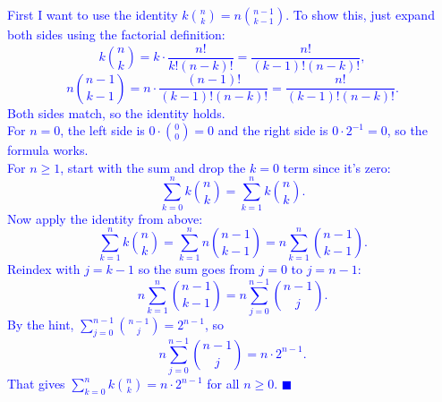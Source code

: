 \documentclass{article}
\begin{document}
\textcolor{blue}{
First I want to use the identity $k\binom{n}{k} = n\binom{n-1}{k-1}$. To show this, just expand both sides using the factorial definition:
\[
k\binom{n}{k} = k \cdot \frac{n!}{k!(n-k)!} = \frac{n!}{(k-1)!(n-k)!},
\]
\[
n\binom{n-1}{k-1} = n \cdot \frac{(n-1)!}{(k-1)!(n-k)!} = \frac{n!}{(k-1)!(n-k)!}.
\]
Both sides match, so the identity holds.
} \\[0.5em]

\textcolor{blue}{
For $n = 0$, the left side is $0 \cdot \binom{0}{0} = 0$ and the right side is $0 \cdot 2^{-1} = 0$, so the formula works.
} \\[0.5em]

\textcolor{blue}{
For $n \geq 1$, start with the sum and drop the $k = 0$ term since it's zero:
\[
\sum_{k=0}^{n} k\binom{n}{k} = \sum_{k=1}^{n} k\binom{n}{k}.
\]
Now apply the identity from above:
\[
\sum_{k=1}^{n} k\binom{n}{k} = \sum_{k=1}^{n} n\binom{n-1}{k-1} = n \sum_{k=1}^{n} \binom{n-1}{k-1}.
\]
Reindex with $j = k - 1$ so the sum goes from $j = 0$ to $j = n-1$:
\[
n \sum_{k=1}^{n} \binom{n-1}{k-1} = n \sum_{j=0}^{n-1} \binom{n-1}{j}.
\]
By the hint, $\sum_{j=0}^{n-1} \binom{n-1}{j} = 2^{n-1}$, so
\[
n \sum_{j=0}^{n-1} \binom{n-1}{j} = n \cdot 2^{n-1}.
\]
That gives $\sum_{k=0}^{n} k\binom{n}{k} = n \cdot 2^{n-1}$ for all $n \geq 0$. $\blacksquare$
}
\end{document}
